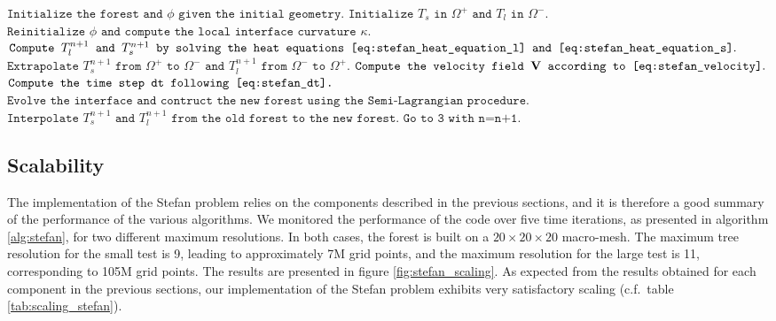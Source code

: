 \begin{algorithm}[htbp]
\caption{$\texttt{General procedure for solving the Stefan problem}$}
\begin{algorithmic}[1]
\State $\texttt{Initialize the forest and }\phi\texttt{ given the initial geometry}.$
\State $\texttt{Initialize }T_s\texttt{ in }\Omega^+\texttt{ and }T_l\texttt{ in }\Omega^-.$
\State $\texttt{Reinitialize }\phi\texttt{ and compute the local interface curvature }\kappa.$
\State $\texttt{Compute }T^{n+1}_l\texttt{ and }T^{n+1}_s\texttt{ by solving the heat equations \eqref{eq:stefan_heat_equation_l} and \eqref{eq:stefan_heat_equation_s}}.$
\State $\texttt{Extrapolate }T^{n+1}_s\texttt{ from }\Omega^+\texttt{ to }\Omega^-\texttt{ and }T^{n+1}_l\texttt{ from }\Omega^-\texttt{ to }\Omega^+.$
\State $\texttt{Compute the velocity field }\mathbf{V}\texttt{ according to \eqref{eq:stefan_velocity}}.$
\State $\texttt{Compute the time step dt following \eqref{eq:stefan_dt}.}$
\State $\texttt{Evolve the interface and contruct the new forest using the Semi-Lagrangian procedure}.$
\State $\texttt{Interpolate }T^{n+1}_s\texttt{ and }T^{n+1}_l\texttt{ from the old forest to the new forest}.$
\State $\texttt{Go to 3 with n=n+1}.$
\end{algorithmic}
\label{alg:stefan}
\end{algorithm}

\subsection{Scalability}

The implementation of the Stefan problem relies on the components described in the previous sections, and it is therefore a good summary of the performance of the various algorithms. We monitored the performance of the code over five time iterations, as presented in algorithm \ref{alg:stefan}, for two different maximum resolutions. In both cases, the forest is built on a $20\times20\times20$ macro-mesh. The maximum tree resolution for the small test is 9, leading to approximately 7M grid points, and the maximum resolution for the large test is 11, corresponding to 105M grid points. The results are presented in figure \ref{fig:stefan_scaling}. As expected from the results obtained for each component in the previous sections, our implementation of the Stefan problem exhibits very satisfactory scaling (c.f.\ table \ref{tab:scaling_stefan}).

